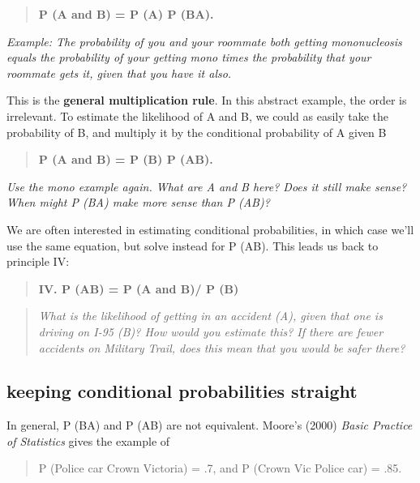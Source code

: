 \documentclass[
  openany]{book}
\begin{document}
\begin{quote}
\textbf{P (A and B) = P (A) P (B\textbar A).}
\end{quote}

\emph{Example: The probability of you and your roommate both getting mononucleosis equals the probability of your getting mono times the probability that your roommate gets it, given that you have it also.}

This is the \textbf{general multiplication rule}. In this abstract example, the order is irrelevant. To estimate the likelihood of A and B, we could as easily take the probability of B, and multiply it by the conditional probability of A given B

\begin{quote}
\textbf{P (A and B) = P (B) P (A\textbar B).}
\end{quote}

\emph{Use the mono example again. What are A and B here? Does it still make sense? When might P (B\textbar A) make more sense than P (A\textbar B)?}

We are often interested in estimating conditional probabilities, in which case we'll use the same equation, but solve instead for P (A\textbar B). This leads us back to principle IV:

\begin{quote}
\textbf{IV. P (A\textbar B) = P (A and B)/ P (B)}
\end{quote}

\begin{quote}
\emph{What is the likelihood of getting in an accident (A), given that one is driving on I-95 (B)? How would you estimate this? If there are fewer accidents on Military Trail, does this mean that you would be safer there?}
\end{quote}

\hypertarget{keeping-conditional-probabilities-straight}{%
\subsection{keeping conditional probabilities straight}\label{keeping-conditional-probabilities-straight}}

In general, P (B\textbar A) and P (A\textbar B) are not equivalent. Moore's (2000) \emph{Basic Practice of Statistics} gives the example of

\begin{quote}
P (Police car \textbar{} Crown Victoria) = .7, and P (Crown Vic \textbar{} Police car) = .85.
\end{quote}
\end{document}
